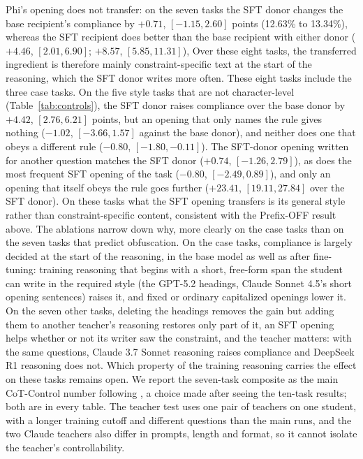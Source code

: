 Phi's opening does not transfer: on the seven tasks the SFT donor changes the base recipient's compliance by $+0.71$, $[-1.15, 2.60]$ points (12.63\% to 13.34\%), whereas the SFT recipient does better than the base recipient with either donor ($+4.46$, $[2.01, 6.90]$; $+8.57$, $[5.85, 11.31]$),
Over these eight tasks, the transferred ingredient is therefore mainly constraint-specific text at the start of the reasoning, which the SFT donor writes more often.
These eight tasks include the three case tasks. On the five style tasks that are not character-level (Table~\ref{tab:controls}), the SFT donor raises compliance over the base donor by $+4.42$, $[2.76, 6.21]$ points, but an opening that only names the rule gives nothing ($-1.02$, $[-3.66, 1.57]$ against the base donor), and neither does one that obeys a different rule ($-0.80$, $[-1.80, -0.11]$). The SFT-donor opening written for another question matches the SFT donor ($+0.74$, $[-1.26, 2.79]$), as does the most frequent SFT opening of the task ($-0.80$, $[-2.49, 0.89]$), and only an opening that itself obeys the rule goes further ($+23.41$, $[19.11, 27.84]$ over the SFT donor). On these tasks what the SFT opening transfers is its general style rather than constraint-specific content, consistent with the Prefix-OFF result above.
The ablations narrow down why, more clearly on the case tasks than on the seven tasks that predict obfuscation. On the case tasks, compliance is largely decided at the start of the reasoning, in the base model as well as after fine-tuning: training reasoning that begins with a short, free-form span the student can write in the required style (the GPT-5.2 headings, Claude Sonnet 4.5's short opening sentences) raises it, and fixed or ordinary capitalized openings lower it. On the seven other tasks, deleting the headings removes the gain but adding them to another teacher's reasoning restores only part of it, an SFT opening helps whether or not its writer saw the constraint, and the teacher matters: with the same questions, Claude 3.7 Sonnet reasoning raises compliance and DeepSeek R1 reasoning does not. Which property of the training reasoning carries the effect on these tasks remains open.
 We report the seven-task composite as the main CoT-Control number following \citet{haskins2026obfuscation}, a choice made after seeing the ten-task results; both are in every table. The teacher test uses one pair of teachers on one student, with a longer training cutoff and different questions than the main runs, and the two Claude teachers also differ in prompts, length and format, so it cannot isolate the teacher's controllability.
